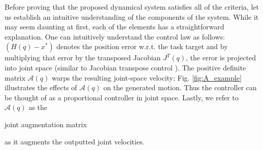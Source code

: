 \documentclass[letterpaper, 10 pt, conference,fleqn]{ieeeconf}
\begin{document}
Before proving that the proposed dynamical system satisfies all of the criteria, let us establish an intuitive understanding of the components of the system. While it may seem daunting at first, each of the elements has a straightforward explanation. One can intuitively understand the control law as follows: $(H(q) - x^*)$ denotes the position error w.r.t. the task target and by multiplying that error by the transposed Jacobian $J^T(q)$, the error is projected into joint space (similar to Jacobian transpose control \cite{wolovich1984computational,sciavicco1988solution}). The positive definite matrix $\mathcal{A}(q)$ warps the resulting joint-space velocity; Fig. \ref{fig:A_example} illustrates the effects of  $\mathcal{A}(q)$ on the generated motion. Thus the controller can be thought of as a proportional controller in joint space. Lastly, we refer to %
$\mathcal{A}(q)$ as the \begin{bf} joint augmentation matrix \end{bf} as it augments the outputted joint velocities.
\end{document}
